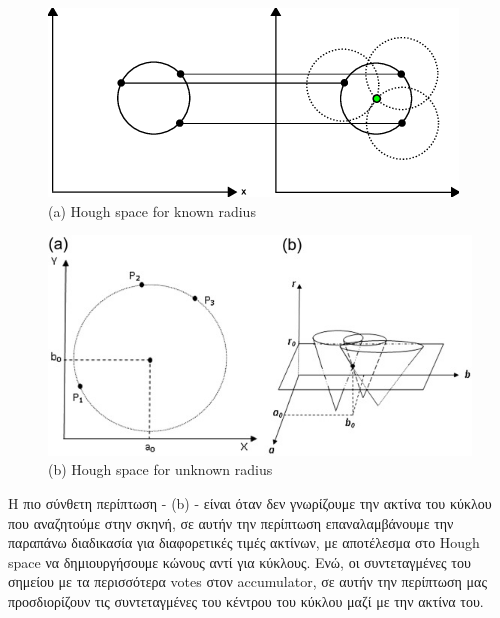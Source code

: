 \begin{figure} [H]
	\centering
    \begin{minipage}{.5\textwidth}
      \centering
      \includegraphics[width=\linewidth]{../Images/Design-Implementation/circle-hough-2d.png}\\
      {(a) Hough space for known radius }
    \end{minipage}%
    \begin{minipage}{.5\textwidth}
      \centering
      \includegraphics[width=.9\linewidth]{../Images/Design-Implementation/circle-hough-3d.jpg}\\
      {(b) Hough space for unknown radius }
	\end{minipage}
    \hfill \break
    \decoRule
    \label{fig:hough-tranform-examples}
\end{figure}

Η πιο σύνθετη περίπτωση -  (b) - είναι όταν δεν γνωρίζουμε την ακτίνα του κύκλου που αναζητούμε στην σκηνή, σε αυτήν την περίπτωση επαναλαμβάνουμε την παραπάνω διαδικασία για διαφορετικές τιμές ακτίνων, με αποτέλεσμα στο Hough space να δημιουργήσουμε κώνους αντί για κύκλους. Ενώ, οι συντεταγμένες του σημείου με τα περισσότερα votes στον accumulator, σε αυτήν την περίπτωση μας προσδιορίζουν τις συντεταγμένες του κέντρου του κύκλου μαζί με την ακτίνα του.

